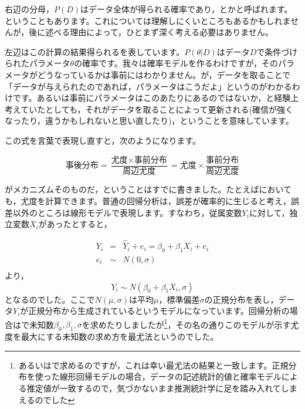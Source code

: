 \documentclass{ltjsbook}
\begin{document}
右辺の分母，$P(D)$はデータ全体が得られる確率であり，とかと呼ばれます。ということもあります。これについては理解しにくいところもあるかもしれませんが，後に述べる理由によって，ひとまず深く考える必要はありません。

左辺はこの計算の結果得られるを表しています。$P(\theta|D)$はデータ$D$で条件づけられたパラメータ$\theta$の確率です。我々は確率モデルを作るわけですが，そのパラメータがどうなっているかは事前にはわかりません。が，データを取ることで「データが与えられたのであれば，パラメータはこうだよ」というのがわかるわけです。あるいは事前にパラメータはこのあたりにあるのではないか，と経験上考えていたとしても，それがデータを取ることによって更新される(確信が強くなったり，違うかもしれないと思い直したり)，ということを意味しています。

この式を言葉で表現し直すと，次のようになります。

$$ \mbox{事後分布} = \frac{\mbox{尤度}\times \mbox{事前分布}}{\mbox{周辺尤度}} = \mbox{尤度} \times \frac{事前分布}{周辺尤度}$$

がメカニズムそのものだ，ということはすでに書きました。たとえばにおいても，尤度を計算できます。普通の回帰分析は，誤差が確率的に生じると考え，誤差以外のところは線形モデルで表現します。すなわち，従属変数$Y_i$に対して，独立変数$X_i$があったとすると，

\begin{equation*}
  \begin{array}{lll}
    Y_i & =    & \hat{Y}_i + e_i = \beta_0 + \beta_1 X_i + e_i \\
    e_i & \sim & N(0,\sigma)                                   \\
  \end{array}
\end{equation*}
より，
$$ Y_i \sim N(\beta_0 + \beta_1 X_i, \sigma) $$
となるのでした。ここで$N(\mu,\sigma)$は平均$\mu$，標準偏差$\sigma$の正規分布を表し，データ$Y_i$が正規分布から生成されているというモデルになっています。回帰分析の場合はで未知数$\beta_0,\beta_1,\sigma$を求めたりしましたが\footnote{あるいはで求めるのですが，これは幸い最尤法の結果と一致します。正規分布を使った線形回帰モデルの場合，データの記述統計的値と確率モデルによる推定値が一致するので，気づかないまま推測統計学に足を踏み入れてしまえるのでした}，その名の通りこのモデルが示す尤度を最大にする未知数の求め方を最尤法というのでした。
\end{document}
